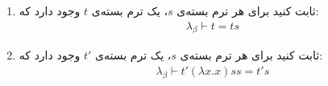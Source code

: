 \begin{enumerate}[label= \textit{(\alph*)}]
    \item 
        ثابت کنید برای هر ترم بسته‌ی $s$، یک ترم بسته‌ی $t$ وجود دارد که:
        \begin{gather*}
            \lambda_\beta \vdash t = ts
        \end{gather*}
    \item 
        ثابت کنید برای هر ترم بسته‌ی $s$، یک ترم بسته‌ی $t'$ وجود دارد که:
        \begin{gather*}
            \lambda_\beta \vdash t' (\lambda x.x)ss = t's
        \end{gather*}
\end{enumerate}
